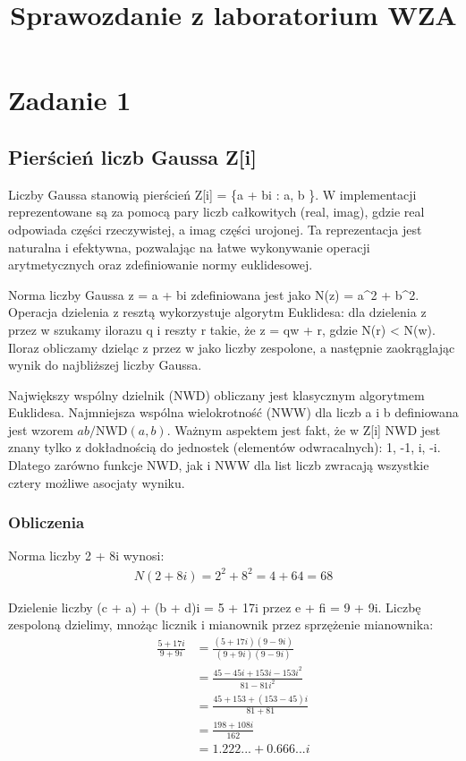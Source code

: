 \documentclass{article}
\title{Sprawozdanie z laboratorium WZA}
\author{}
\date{}
\begin{document}
\maketitle

\section*{Zadanie 1}

\subsection*{Pierścień liczb Gaussa Z[i]}

Liczby Gaussa stanowią pierścień Z[i] = \{a + bi : a, b \in {}\}. W implementacji reprezentowane są za pomocą pary liczb całkowitych (real, imag), gdzie real odpowiada części rzeczywistej, a imag części urojonej. Ta reprezentacja jest naturalna i efektywna, pozwalając na łatwe wykonywanie operacji arytmetycznych oraz zdefiniowanie normy euklidesowej.

Norma liczby Gaussa z = a + bi zdefiniowana jest jako N(z) = a^2 + b^2. Operacja dzielenia z resztą wykorzystuje algorytm Euklidesa: dla dzielenia z przez w szukamy ilorazu q i reszty r takie, że z = qw + r, gdzie N(r) < N(w). Iloraz obliczamy dzieląc z przez w jako liczby zespolone, a następnie zaokrąglając wynik do najbliższej liczby Gaussa.

Największy wspólny dzielnik (NWD) obliczany jest klasycznym algorytmem Euklidesa. Najmniejsza wspólna wielokrotność (NWW) dla liczb a i b definiowana jest wzorem \(ab / \text{NWD}(a,b)\). Ważnym aspektem jest fakt, że w Z[i] NWD jest znany tylko z dokładnością do jednostek (elementów odwracalnych): 1, -1, i, -i. Dlatego zarówno funkcje NWD, jak i NWW dla list liczb zwracają wszystkie cztery możliwe asocjaty wyniku.

\subsubsection*{Obliczenia}

Norma liczby 2 + 8i wynosi:
\begin{align*}
N(2 + 8i) = 2^2 + 8^2 = 4 + 64 = 68
\end{align*}

Dzielenie liczby (c + a) + (b + d)i = 5 + 17i przez e + fi = 9 + 9i. Liczbę zespoloną dzielimy, mnożąc licznik i mianownik przez sprzężenie mianownika:
\begin{align*}
\frac{5 + 17i}{9 + 9i} &= \frac{(5 + 17i)(9 - 9i)}{(9 + 9i)(9 - 9i)} \\
&= \frac{45 - 45i + 153i - 153i^2}{81 - 81i^2} \\
&= \frac{45 + 153 + (153 - 45)i}{81 + 81} \\
&= \frac{198 + 108i}{162} \\
&= 1.222... + 0.666...i
\end{align*}
\end{document}
